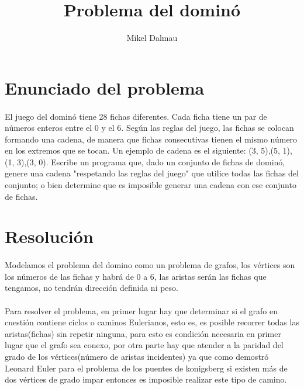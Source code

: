 \documentclass[es]{ifirak}
\begin{document}
\title{Problema del dominó}
\author{Mikel Dalmau}

\maketitle

%


\section{Enunciado del problema}
\paragraph{}
\large{
El juego del dominó tiene 28 fichas diferentes. Cada ficha tiene un par de números
enteros entre el 0 y el 6. Según las reglas del juego, las fichas se colocan formando una
cadena, de manera que fichas consecutivas tienen el mismo número en los extremos
que se tocan. Un ejemplo de cadena es el siguiente: (3, 5),(5, 1),(1, 3),(3, 0).
Escribe un programa que, dado un conjunto de fichas de dominó, genere una cadena
"respetando las reglas del juego" que utilice todas las fichas del conjunto; o bien determine que es imposible generar una cadena con ese conjunto de fichas.}

\section{Resolución}
\paragraph{}

Modelamos el problema del domino como un problema de grafos, los vértices son los números de las fichas y habrá de 0 a 6, las aristas serán las fichas que tengamos, no tendrán dirección definida ni peso.
\paragraph{}
Para resolver el problema, en primer lugar hay que determinar si el grafo en cuestión contiene ciclos o caminos Eulerianos, esto es, es posible recorrer todas las aristas(fichas) sin repetir ninguna, para esto es condición necesaria en primer lugar que el grafo sea conexo, por otra parte hay que atender a la paridad del grado de los vértices(número de aristas incidentes) ya que como demostró Leonard Euler para el problema de los puentes de konigsberg si existen más de dos vértices de grado impar entonces es imposible realizar este tipo de camino.
\end{document}
